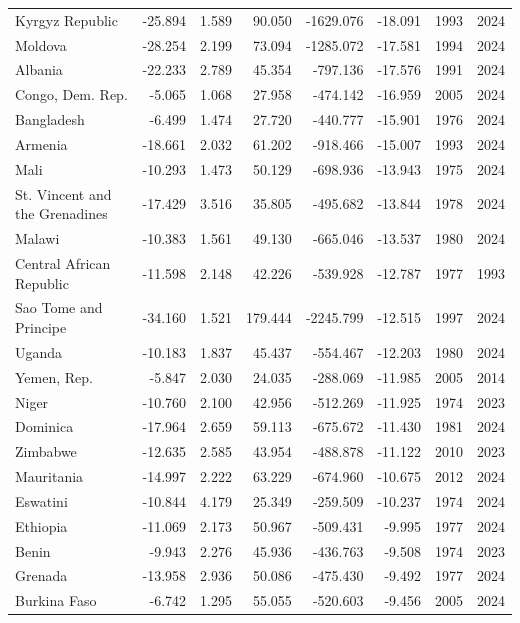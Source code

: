 \begin{table}[p]
{\begin{tabular}{lrrrrrrr}
  Kyrgyz Republic & -25.894 & 1.589 & 90.050 & -1629.076 & -18.091 & 1993 & 2024 \\ 
  Moldova & -28.254 & 2.199 & 73.094 & -1285.072 & -17.581 & 1994 & 2024 \\ 
  Albania & -22.233 & 2.789 & 45.354 & -797.136 & -17.576 & 1991 & 2024 \\ 
  Congo, Dem. Rep. & -5.065 & 1.068 & 27.958 & -474.142 & -16.959 & 2005 & 2024 \\ 
  Bangladesh & -6.499 & 1.474 & 27.720 & -440.777 & -15.901 & 1976 & 2024 \\ 
  Armenia & -18.661 & 2.032 & 61.202 & -918.466 & -15.007 & 1993 & 2024 \\ 
  Mali & -10.293 & 1.473 & 50.129 & -698.936 & -13.943 & 1975 & 2024 \\ 
  St. Vincent and the Grenadines & -17.429 & 3.516 & 35.805 & -495.682 & -13.844 & 1978 & 2024 \\ 
  Malawi & -10.383 & 1.561 & 49.130 & -665.046 & -13.537 & 1980 & 2024 \\ 
  Central African Republic & -11.598 & 2.148 & 42.226 & -539.928 & -12.787 & 1977 & 1993 \\ 
  Sao Tome and Principe & -34.160 & 1.521 & 179.444 & -2245.799 & -12.515 & 1997 & 2024 \\ 
  Uganda & -10.183 & 1.837 & 45.437 & -554.467 & -12.203 & 1980 & 2024 \\ 
  Yemen, Rep. & -5.847 & 2.030 & 24.035 & -288.069 & -11.985 & 2005 & 2014 \\ 
  Niger & -10.760 & 2.100 & 42.956 & -512.269 & -11.925 & 1974 & 2023 \\ 
  Dominica & -17.964 & 2.659 & 59.113 & -675.672 & -11.430 & 1981 & 2024 \\ 
  Zimbabwe & -12.635 & 2.585 & 43.954 & -488.878 & -11.122 & 2010 & 2023 \\ 
  Mauritania & -14.997 & 2.222 & 63.229 & -674.960 & -10.675 & 2012 & 2024 \\ 
  Eswatini & -10.844 & 4.179 & 25.349 & -259.509 & -10.237 & 1974 & 2024 \\ 
  Ethiopia & -11.069 & 2.173 & 50.967 & -509.431 & -9.995 & 1977 & 2024 \\ 
  Benin & -9.943 & 2.276 & 45.936 & -436.763 & -9.508 & 1974 & 2023 \\ 
  Grenada & -13.958 & 2.936 & 50.086 & -475.430 & -9.492 & 1977 & 2024 \\ 
  Burkina Faso & -6.742 & 1.295 & 55.055 & -520.603 & -9.456 & 2005 & 2024 \\ 

\end{tabular}}
\end{table}
